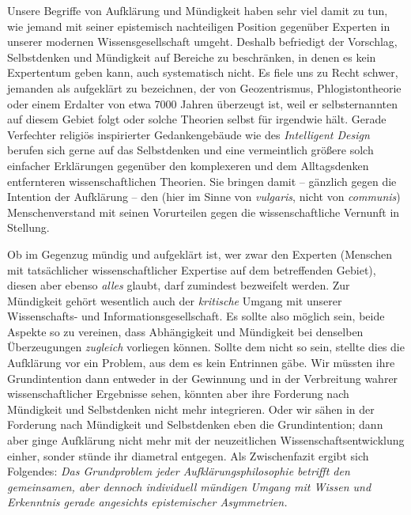 Unsere Begriffe von Aufklärung und Mündigkeit haben sehr viel damit zu tun, wie
jemand mit seiner epistemisch nachteiligen Position gegenüber Experten in
unserer modernen Wissensgesellschaft umgeht. Deshalb befriedigt der Vorschlag,
Selbstdenken und Mündigkeit auf Bereiche zu beschränken, in denen es kein
Expertentum geben kann, auch systematisch nicht. Es fiele uns zu Recht schwer,
jemanden als aufgeklärt zu bezeichnen, der von Geozentrismus, Phlogistontheorie
oder einem Erdalter von etwa 7000 Jahren überzeugt ist, weil er selbsternannten
 auf diesem Gebiet folgt oder solche Theorien selbst für
irgendwie  hält. Gerade Verfechter religiös
inspirierter Gedankengebäude wie des \emph{Intelligent Design} berufen sich
gerne auf das Selbstdenken und eine vermeintlich größere
 solch einfacher Erklärungen gegenüber den
komplexeren und dem Alltagsdenken entfernteren wissenschaftlichen Theorien. Sie
bringen damit -- gänzlich gegen die Intention der Aufklärung -- den
 (hier im Sinne von \emph{vulgaris}, nicht von
\emph{communis}) Menschenverstand mit seinen Vorurteilen gegen die
wissenschaftliche Vernunft in Stellung.


Ob im Gegenzug mündig und aufgeklärt ist, wer zwar den 
Experten (Menschen mit tatsächlicher wissenschaftlicher Expertise auf dem
betreffenden Gebiet), diesen aber ebenso \emph{alles} glaubt, darf zumindest
bezweifelt werden. Zur Mündigkeit gehört wesentlich auch der \emph{kritische}
Umgang mit unserer Wissenschafts- und Informationsgesellschaft. Es sollte also
möglich sein, beide Aspekte so zu vereinen, dass Abhängigkeit und Mündigkeit bei
denselben Überzeugungen \emph{zugleich} vorliegen können. Sollte dem nicht so
sein, stellte dies die Aufklärung vor ein Problem, aus dem es kein Entrinnen
gäbe. Wir müssten ihre Grundintention dann entweder in der Gewinnung und in der
Verbreitung wahrer wissenschaftlicher Ergebnisse sehen, könnten aber ihre
Forderung nach Mündigkeit und Selbstdenken nicht mehr integrieren. Oder wir
sähen in der Forderung nach Mündigkeit und Selbstdenken eben die Grundintention;
dann aber ginge Aufklärung nicht mehr mit der neuzeitlichen
Wissen\-schafts\-ent\-wick\-lung einher, sonder stünde ihr diametral entgegen.
Als Zwischenfazit ergibt sich Folgendes: \emph{Das Grundproblem jeder
Aufklärungsphilosophie betrifft den \emph{gemeinsamen}, aber dennoch individuell
\emph{mündigen} Umgang mit Wissen und Erkenntnis gerade angesichts epistemischer
Asymmetrien.}



